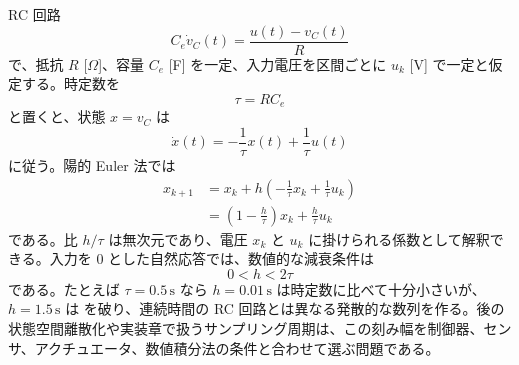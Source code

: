 RC 回路
\begin{equation}
  C_e\dot{v}_C(t)=\frac{u(t)-v_C(t)}{R}
\end{equation}
で、抵抗 $R$ [$\Omega$]、容量 $C_e$ [F] を一定、入力電圧を区間ごとに $u_k$ [V] で一定と仮定する。時定数を
\begin{equation}
  \tau=R C_e
\end{equation}
と置くと、状態 $x=v_C$ は
\begin{equation}
  \dot{x}(t)=-\frac{1}{\tau}x(t)+\frac{1}{\tau}u(t)
\end{equation}
に従う。陽的 Euler 法では
\begin{align}
  x_{k+1}
  &=x_k+h\left(-\frac{1}{\tau}x_k+\frac{1}{\tau}u_k\right)\\
  &=\left(1-\frac{h}{\tau}\right)x_k+\frac{h}{\tau}u_k
  \label{eq:rc-explicit-euler-update}
\end{align}
である。比 $h/\tau$ は無次元であり、電圧 $x_k$ と $u_k$ に掛けられる係数として解釈できる。入力を 0 とした自然応答では、数値的な減衰条件は
\begin{equation}
  0<h<2\tau
\end{equation}
である。たとえば $\tau=0.5\,\mathrm{s}$ なら $h=0.01\,\mathrm{s}$ は時定数に比べて十分小さいが、$h=1.5\,\mathrm{s}$ は  を破り、連続時間の RC 回路とは異なる発散的な数列を作る。後の状態空間離散化や実装章で扱うサンプリング周期は、この刻み幅を制御器、センサ、アクチュエータ、数値積分法の条件と合わせて選ぶ問題である。
